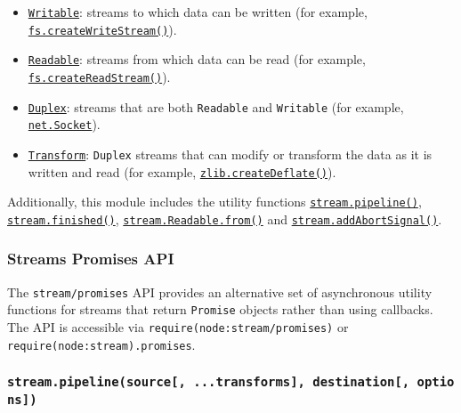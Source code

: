 \begin{itemize}
\tightlist
\item
  \hyperref[class-streamwritable]{\texttt{Writable}}: streams to which
  data can be written (for example,
  \href{fs.md\#fscreatewritestreampath-options}{\texttt{fs.createWriteStream()}}).
\item
  \hyperref[class-streamreadable]{\texttt{Readable}}: streams from which
  data can be read (for example,
  \href{fs.md\#fscreatereadstreampath-options}{\texttt{fs.createReadStream()}}).
\item
  \hyperref[class-streamduplex]{\texttt{Duplex}}: streams that are both
  \texttt{Readable} and \texttt{Writable} (for example,
  \href{net.md\#class-netsocket}{\texttt{net.Socket}}).
\item
  \hyperref[class-streamtransform]{\texttt{Transform}}: \texttt{Duplex}
  streams that can modify or transform the data as it is written and
  read (for example,
  \href{zlib.md\#zlibcreatedeflateoptions}{\texttt{zlib.createDeflate()}}).
\end{itemize}

Additionally, this module includes the utility functions
\hyperref[streampipelinesource-transforms-destination-callback]{\texttt{stream.pipeline()}},
\hyperref[streamfinishedstream-options-callback]{\texttt{stream.finished()}},
\hyperref[streamreadablefromiterable-options]{\texttt{stream.Readable.from()}}
and
\hyperref[streamaddabortsignalsignal-stream]{\texttt{stream.addAbortSignal()}}.

\subsubsection{Streams Promises API}\label{streams-promises-api}

The \texttt{stream/promises} API provides an alternative set of
asynchronous utility functions for streams that return \texttt{Promise}
objects rather than using callbacks. The API is accessible via
\texttt{require(\textquotesingle{}node:stream/promises\textquotesingle{})}
or
\texttt{require(\textquotesingle{}node:stream\textquotesingle{}).promises}.

\subsubsection{\texorpdfstring{\texttt{stream.pipeline(source{[},\ ...transforms{]},\ destination{[},\ options{]})}}{stream.pipeline(source{[}, ...transforms{]}, destination{[}, options{]})}}\label{stream.pipelinesource-...transforms-destination-options}

